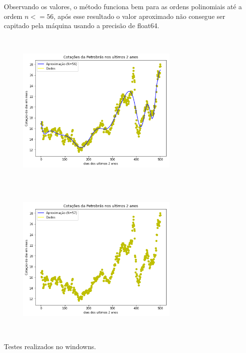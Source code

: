 \documentclass{article}
\begin{document}
\newpage

Observando os valores, o método funciona bem para as ordens polinomiais até a ordem $n <= 56$, após esse resultado o valor aproximado não consegue ser capitado pela máquina usando a precisão de float64.

\begin{figure}[!htb]
\includegraphics [width=8cm,height=8cm]{G56.png}
\includegraphics [width=8cm,height=8cm]{G57.png}
\end{figure}

Testes realizados no windowns.
\end{document}
